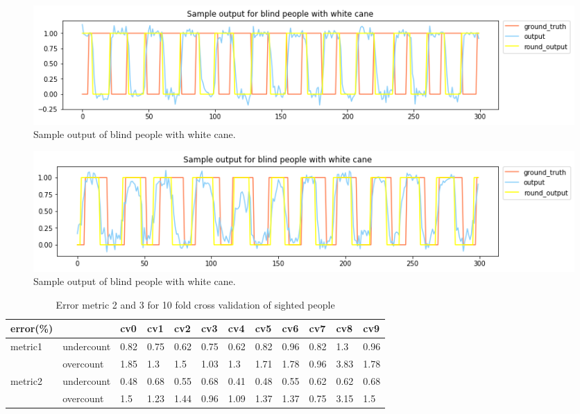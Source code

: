 \documentclass[11pt]{article}
\begin{document}
\begin{figure}[ht]
\centering
\includegraphics[scale=0.5]{output_wc_1}
\caption{Sample output of blind people with white cane.}
\label{fig:output_wc_1}
\end{figure}

\begin{figure}[ht]
\centering
\includegraphics[scale=0.5]{output_wc_2}
\caption{Sample output of blind people with white cane.}
\label{fig:output_wc_2}
\end{figure}




\begin{table}[]
\centering
\caption{Error metric 2 and 3 for 10 fold cross validation of sighted people}
\label{label_metric23_sighted}
\begin{tabular}{llllllllllll}
\hline
error(\%)                &            & cv0   & cv1   & cv2   & cv3   & cv4   & cv5   & cv6   & cv7   & cv8   & cv9  \\ \hline
metric1                  & undercount & 0.82  & 0.75  & 0.62  & 0.75  & 0.62  & 0.82  & 0.96  & 0.82  & 1.3   & 0.96 \\
                         & overcount  & 1.85  & 1.3   & 1.5   & 1.03  & 1.3   & 1.71  & 1.78  & 0.96  & 3.83  & 1.78 \\ \hline
\multirow{2}{*}{metric2} & undercount & 0.48  & 0.68  & 0.55  & 0.68  & 0.41  & 0.48  & 0.55  & 0.62  & 0.62  & 0.68 \\
                         & overcount  & 1.5   & 1.23  & 1.44  & 0.96  & 1.09  & 1.37  & 1.37  & 0.75  & 3.15  & 1.5  \\ \hline
\end{tabular}
\end{table}
\end{document}

